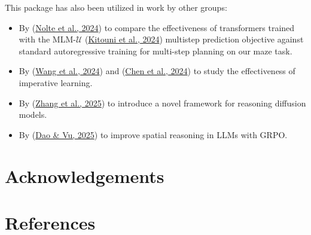 \documentclass[10pt,a4paper,onecolumn]{article}
\begin{document}
This package has also been utilized in work by other groups:

\begin{itemize}
\item
  By (\protect\hyperlink{ref-nolte2024multistep}{Nolte et al., 2024}) to
  compare the effectiveness of transformers trained with the
  MLM-\(\mathcal{U}\)
  (\protect\hyperlink{ref-MLMU-kitouni2024factorization}{Kitouni et al.,
  2024}) multistep prediction objective against standard autoregressive
  training for multi-step planning on our maze task.
\item
  By (\protect\hyperlink{ref-wang2024imperative}{Wang et al., 2024}) and
  (\protect\hyperlink{ref-chen2024iaimperative}{Chen et al., 2024}) to
  study the effectiveness of imperative learning.
\item
  By (\protect\hyperlink{ref-zhang2025tscend}{Zhang et al., 2025}) to
  introduce a novel framework for reasoning diffusion models.
\item
  By (\protect\hyperlink{ref-dao2025alphamaze}{Dao \& Vu, 2025}) to
  improve spatial reasoning in LLMs with GRPO.
\end{itemize}

\hypertarget{acknowledgements}{%
\section{Acknowledgements}\label{acknowledgements}}



\newpage

\hypertarget{references}{%
\section*{References}\label{references}}
\end{document}
